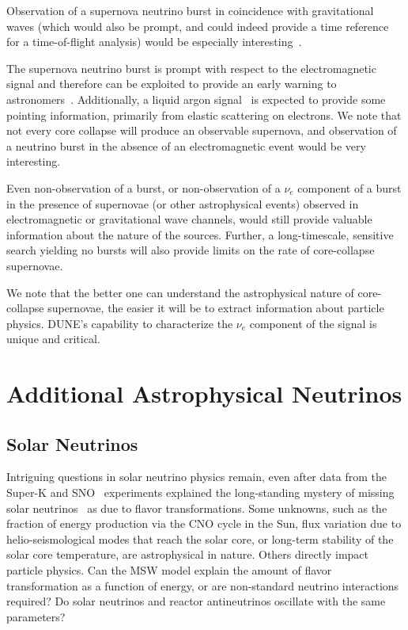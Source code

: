 Observation of a supernova neutrino burst in coincidence with gravitational waves (which would also be prompt, and could indeed provide a time reference for a time-of-flight analysis) would be especially interesting~\cite{Arnaud:2003zr,Ott:2012jq, Mueller:2012sv, Nishizawa:2014zna}.

The supernova neutrino burst is prompt with respect to the
electromagnetic signal and therefore can be exploited to provide an
early warning to astronomers~\cite{Antonioli:2004zb,Scholberg:2008fa}.  
Additionally, a liquid argon signal~\cite{Bueno:2003ei} is expected to
provide some pointing information, primarily from elastic scattering
on electrons.
We note that not every core collapse will produce an observable supernova, and observation of a neutrino burst in the absence of an electromagnetic event would be very interesting. 

Even non-observation of a burst, or non-observation of
a $\nu_e$ component of a burst in the presence of supernovae (or other
astrophysical events) observed in electromagnetic or gravitational
wave channels, would still provide valuable information about the
nature of the sources.  Further, a long-timescale, sensitive search
yielding no bursts will also provide limits on the rate of
core-collapse supernovae.

We note that the better one can understand the astrophysical nature of core-collapse supernovae, the easier it will be to extract information about particle physics.  DUNE's capability to characterize the $\nu_e$ component of the signal is unique and critical.


\section{Additional Astrophysical Neutrinos}
\label{sec:physics-snblowe-other}

\subsection{Solar Neutrinos}

Intriguing questions in solar neutrino physics remain,
even after data
from the Super-K and SNO~\cite{Fukuda:2001nj,Ahmad:2001an}
experiments explained the long-standing mystery of missing solar
neutrinos~\cite{Cleveland:1998nv} as due to flavor
transformations. 
Some unknowns, such as the fraction of energy production via the CNO
cycle in the Sun, flux variation due to helio-seismological modes that
reach the solar core, or long-term stability of the solar core
temperature, are astrophysical in nature. Others directly impact
particle physics. Can the MSW model explain the amount of flavor
transformation as a function of energy, or are non-standard neutrino
interactions required?  Do solar neutrinos and reactor antineutrinos
oscillate with the same parameters? 

